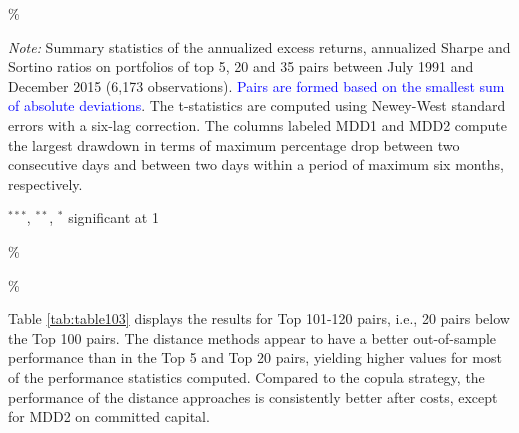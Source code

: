 \documentclass[a4paper]{article}
\begin{document}
\begin{threeparttable}[H]
\begin{tabularx}{\textwidth}{@{\extracolsep{\fill}}llllllll@{}}
			\bottomrule
		\end{tabularx}\%
		\begin{tablenotes}
			\item \textit{Note:} \tiny Summary statistics of the annualized excess returns, annualized Sharpe and Sortino ratios on portfolios of top 5, 20 and 35 pairs between July 1991 and December 2015 (6,173 observations). \textcolor{blue} {Pairs are formed based on the smallest sum of absolute deviations}. The t-statistics are computed using Newey-West standard errors with a six-lag correction. The columns labeled MDD1 and MDD2 compute the largest drawdown in terms of maximum percentage drop between two consecutive days and between two days within a period of maximum six months, respectively.
			\item \scriptsize $^{\ast\ast\ast}$, $^{\ast\ast}$, $^{\ast}$  significant at 1\\%
		\end{tablenotes}
		\label{tab:table102}\%
	\end{threeparttable}\%
	
	\vspace{1.0cm}
	
	Table \ref{tab:table103} displays the results for Top 101-120 pairs, i.e., 20 pairs below the Top 100 pairs. The distance methods appear to have a better out-of-sample performance than in the Top 5 and Top 20 pairs, yielding higher values for most of the performance statistics computed. Compared to the copula strategy, the performance of the distance approaches is consistently better after costs, except for MDD2 on committed capital.
	
	
	
\end{document}
